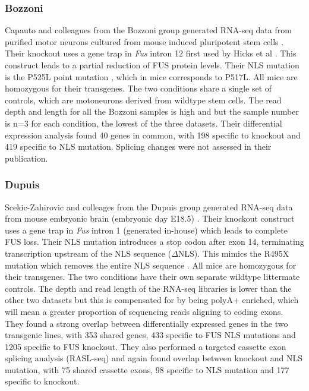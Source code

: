 \subsubsection{Bozzoni}
Capauto and colleagues from the Bozzoni group generated RNA-seq data from purified motor neurons cultured from mouse induced pluripotent stem cells \citep{Capauto2018}. 
Their knockout uses a gene trap in \textit{Fus} intron 12 first used by Hicks et al \citeyear{Hicks2000}.
This construct leads to a partial reduction of FUS protein levels.
Their NLS mutation is the P525L point mutation \citep{Chio2009}, which in mice corresponds to P517L.  
All mice are homozygous for their transgenes. 
The two conditions share a single set of controls, which are motoneurons derived from wildtype stem cells.
The read depth and length for all the Bozzoni samples is high  and but the sample number is n=3 for each condition, the lowest of the three datasets.
Their differential expression analysis found 40 genes in common, with 198 specific to knockout and 419 specific to NLS mutation. 
Splicing changes were not assessed in their publication.

\subsubsection{Dupuis}
Scekic-Zahirovic and colleages from the Dupuis group generated RNA-seq data from mouse embryonic brain (embryonic day E18.5) \citep{Scekic-zahirovic2016}. 
Their knockout construct uses a gene trap in \textit{Fus} intron 1 (generated in-house) which leads to complete FUS loss.  
Their NLS mutation introduces a stop codon after exon 14, terminating transcription upstream of the NLS sequence ($\Delta$NLS).  
This mimics the R495X mutation which removes the entire NLS sequence \citep{Bosco2010}.
All mice are homozygous for their transgenes. 
The two conditions have their own separate wildtype littermate controls. 
The depth and read length of the RNA-seq libraries is lower than the other two datasets but this is compensated for by being polyA+ enriched, which will mean a greater proportion of sequencing reads aligning to coding exons.  
They found a strong overlap between differentially expressed genes in the two transgenic lines, with 353 shared genes, 433 specific to FUS NLS mutations and 1205 specific to FUS knockout. 
They also performed a targeted cassette exon splicing analysis (RASL-seq) and again found overlap between knockout and NLS mutation, with 75 shared cassette exons, 98 specific to NLS mutation and 177 specific to knockout. 

